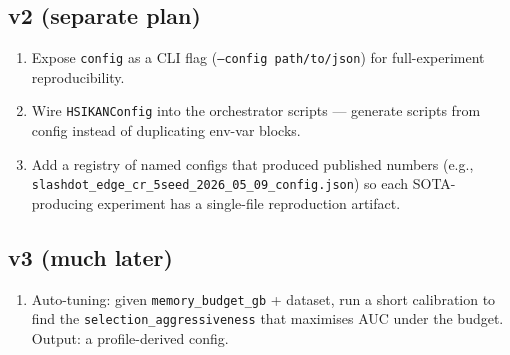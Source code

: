 \documentclass[11pt,a4paper]{article}
\begin{document}
\subsection*{v2 (separate plan)}
\begin{enumerate}
\item Expose \texttt{config} as a CLI flag (\texttt{--config path/to/json})
  for full-experiment reproducibility.
\item Wire \texttt{HSIKANConfig} into the orchestrator scripts ---
  generate scripts from config instead of duplicating env-var blocks.
\item Add a registry of named configs that produced published numbers
  (e.g., \texttt{slashdot\_edge\_cr\_5seed\_2026\_05\_09\_config.json})
  so each SOTA-producing experiment has a single-file reproduction
  artifact.
\end{enumerate}

\subsection*{v3 (much later)}
\begin{enumerate}
\item Auto-tuning: given \texttt{memory\_budget\_gb} + dataset, run a
  short calibration to find the \texttt{selection\_aggressiveness} that
  maximises AUC under the budget.  Output: a profile-derived config.
\end{enumerate}
\end{document}
